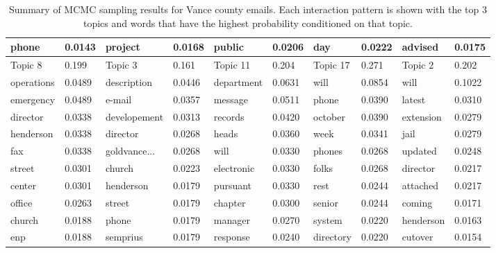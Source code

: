 \documentclass[a4paper]{article}
\begin{document}
\begin{table}[ht]
\begin{tabular}{|l|l||l|l||l|l||l|l||l|l|}
		\scriptsize phone&\scriptsize 0.0143&\scriptsize project&\scriptsize 0.0168&\scriptsize public&\scriptsize0.0206&\scriptsize day&\scriptsize 0.0222&\scriptsize advised&\scriptsize 0.0175\\
		\hline\hline
		Topic 8&0.199&Topic 3&0.161&Topic 11 &0.204& Topic 17 & 0.271& Topic 2&0.202\\
		\hline
		\scriptsize operations&\scriptsize 0.0489&\scriptsize description&\scriptsize0.0446&\scriptsize department&\scriptsize 0.0631&\scriptsize will&\scriptsize 0.0854&\scriptsize will&\scriptsize 0.1022\\
		\scriptsize emergency&\scriptsize 0.0489&\scriptsize e-mail&\scriptsize 0.0357&\scriptsize message&\scriptsize0.0511&\scriptsize phone&\scriptsize 0.0390&\scriptsize latest&\scriptsize 0.0310\\
		\scriptsize director&\scriptsize 0.0338&\scriptsize developement&\scriptsize  0.0313&\scriptsize records&\scriptsize 0.0420&\scriptsize october&\scriptsize 0.0390&\scriptsize extension&\scriptsize 0.0279\\
		\scriptsize henderson&\scriptsize 0.0338&\scriptsize director&\scriptsize 0.0268&\scriptsize heads&\scriptsize 0.0360&\scriptsize week&\scriptsize 0.0341&\scriptsize jail&\scriptsize 0.0279\\
		\scriptsize fax&\scriptsize 0.0338&\scriptsize goldvance...&\scriptsize 0.0268&\scriptsize will&\scriptsize 0.0330&\scriptsize phones&\scriptsize 0.0268&\scriptsize updated&\scriptsize 0.0248\\
		\scriptsize street&\scriptsize 0.0301&\scriptsize church&\scriptsize 0.0223&\scriptsize electronic&\scriptsize 0.0330&\scriptsize folks&\scriptsize 0.0268&\scriptsize director&\scriptsize  0.0217\\
		\scriptsize center&\scriptsize 0.0301&\scriptsize henderson&\scriptsize 0.0179&\scriptsize pursuant&\scriptsize 0.0330&\scriptsize rest&\scriptsize 0.0244&\scriptsize attached&\scriptsize 0.0217\\
		\scriptsize office&\scriptsize 0.0263&\scriptsize street&\scriptsize 0.0179&\scriptsize chapter&\scriptsize 0.0300&\scriptsize senior&\scriptsize 0.0244&\scriptsize coming&\scriptsize 0.0171\\
		\scriptsize church&\scriptsize 0.0188&\scriptsize phone&\scriptsize 0.0179&\scriptsize manager&\scriptsize 0.0270&\scriptsize system&\scriptsize 0.0220&\scriptsize henderson&\scriptsize 0.0163\\
		\scriptsize enp&\scriptsize 0.0188&\scriptsize semprius&\scriptsize 0.0179&\scriptsize response&\scriptsize 0.0240&\scriptsize directory&\scriptsize 0.0220&\scriptsize cutover&\scriptsize  0.0154\\
		\hline
	\end{tabular}
	\caption {Summary of MCMC sampling results for Vance county emails. Each interaction pattern is shown with the top 3 topics and words that have the highest probability conditioned on that topic.}
	\label{table:VanceMCMC}
\end{table}
\end{document}
